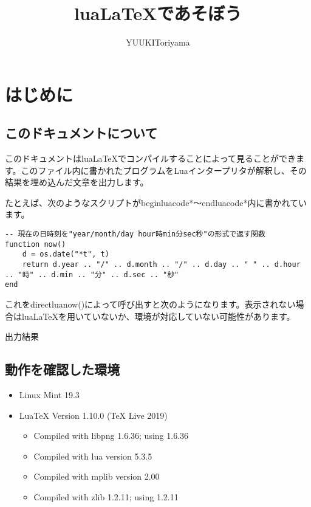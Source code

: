 \documentclass[a4paper]{article}
\begin{document}
\title{luaLaTeXであそぼう}
\author{YUUKIToriyama}
\date{}

\maketitle

	\section{はじめに}
	
	\subsection{このドキュメントについて}
	このドキュメントはluaLaTeXでコンパイルすることによって見ることができます。このファイル内に書かれたプログラムをLuaインタープリタが解釈し、その結果を埋め込んだ文章を出力します。

	たとえば、次のようなスクリプトがbeginluacode*〜endluacode*内に書かれています。

	\begin{lstlisting}
-- 現在の日時刻を"year/month/day hour時min分sec秒"の形式で返す関数
function now()
	d = os.date("*t", t)
	return d.year .. "/" .. d.month .. "/" .. d.day .. " " .. d.hour .. "時" .. d.min .. "分" .. d.sec .. "秒"
end
	\end{lstlisting}

	これをdirectluanow()によって呼び出すと次のようになります。表示されない場合はluaLaTeXを用いていないか、環境が対応していない可能性があります。
	
	\begin{itembox}[l]{出力結果}
	\end{itembox}

	\subsection{動作を確認した環境}
	\begin{itemize}
		\item Linux Mint 19.3
		\item LuaTeX Version 1.10.0 (TeX Live 2019)
			\begin{itemize}
				\item Compiled with libpng 1.6.36; using 1.6.36
				\item Compiled with lua version 5.3.5
				\item Compiled with mplib version 2.00
				\item Compiled with zlib 1.2.11; using 1.2.11
			\end{itemize}
	\end{itemize}
\end{document}
